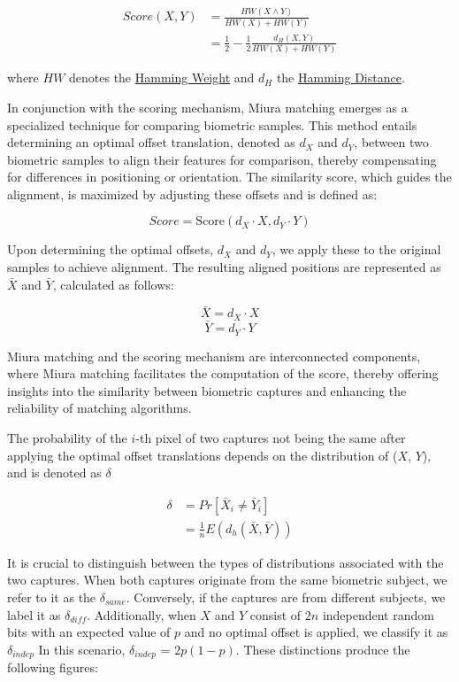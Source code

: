 \begin{equation} \label{eq:score}
    \begin{aligned}
        Score(X, Y) &= \frac{HW(X \land Y)}{HW(X) + HW(Y)}\\
        &= \frac{1}{2}-\frac{1}{2}\frac{d_H(X, Y)}{HW(X) + HW(Y)}
    \end{aligned}
\end{equation}

where \(HW\) denotes the \hyperref[def:Hamming Weight]{Hamming Weight} and \(d_H\) the \hyperref[def:Hamming Distance]{Hamming Distance}. 

In conjunction with the scoring mechanism, Miura matching emerges as a specialized technique for comparing biometric samples. This method entails determining an optimal offset translation, denoted as \(d_X\) and \(d_Y\), between two biometric samples to align their features for comparison, thereby compensating for differences in positioning or orientation. The similarity score, which guides the alignment, is maximized by adjusting these offsets and is defined as:

\[Score = \text{Score}(d_X \cdot X, d_Y \cdot Y)\]

Upon determining the optimal offsets, \(d_X\) and \(d_Y\), we apply these to the original samples to achieve alignment. The resulting aligned positions are represented as \(\bar{X}\) and \(\bar{Y}\), calculated as follows:

\[\bar{X} = d_X \cdot X\]
\[\bar{Y} = d_Y \cdot Y\]

Miura matching and the scoring mechanism are interconnected components, where Miura matching facilitates the computation of the score, thereby offering insights into the similarity between biometric captures and enhancing the reliability of matching algorithms.

The probability of the \(i\)-th pixel of two captures not being the same after applying the optimal offset translations depends on the distribution of (\(X\), \(Y\)), and is denoted as \(\delta\)

\begin{equation} \label{eq:delta}
    \begin{aligned}
        \delta &= Pr[\bar{X}_i \neq \bar{Y}_i]\\
        &= \frac{1}{n}E(d_h(\bar{X}, \bar{Y}))
    \end{aligned}
\end{equation}

It is crucial to distinguish between the types of distributions associated with the two captures. When both captures originate from the same biometric subject, we refer to it as the $\delta_{same}$. Conversely, if the captures are from different subjects, we label it as $\delta_{diff}$. Additionally, when \(X\) and \(Y\) consist of \(2n\) independent random bits with an expected value of \(p\) and no optimal offset is applied, we classify it as $\delta_{indep}$ In this scenario, \(\delta_{indep}\) = \(2p(1-p)\). These distinctions produce the following figures: 

